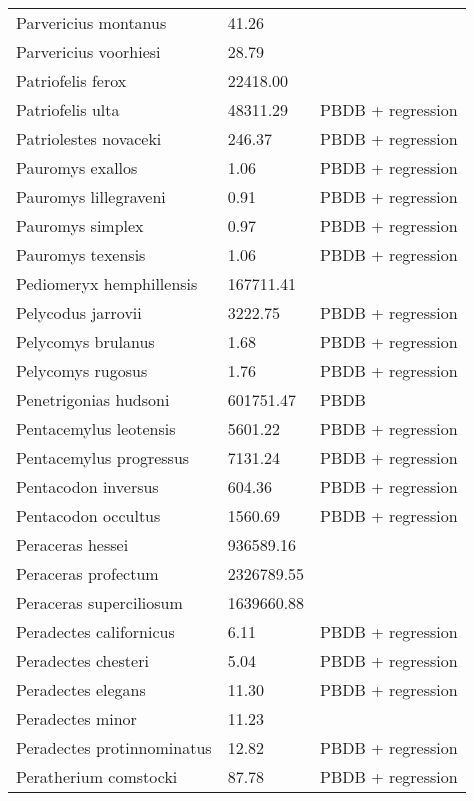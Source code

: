 \documentclass{article}
\begin{document}
\begin{center}
\begin{longtable}{p{} p{} p{}}
    Parvericius montanus & 41.26 & \cite{Tomiya2013} \\ 
    Parvericius voorhiesi & 28.79 & \cite{Tomiya2013} \\ 
    Patriofelis ferox & 22418.00 & \cite{McKenna2011} \\ 
    Patriofelis ulta & 48311.29 & PBDB + regression \\ 
    Patriolestes novaceki & 246.37 & PBDB + regression \\ 
    Pauromys exallos & 1.06 & PBDB + regression \\ 
    Pauromys lillegraveni & 0.91 & PBDB + regression \\ 
    Pauromys simplex & 0.97 & PBDB + regression \\ 
    Pauromys texensis & 1.06 & PBDB + regression \\ 
    Pediomeryx hemphillensis & 167711.41 & \cite{Tomiya2013} \\ 
    Pelycodus jarrovii & 3222.75 & PBDB + regression \\ 
    Pelycomys brulanus & 1.68 & PBDB + regression \\ 
    Pelycomys rugosus & 1.76 & PBDB + regression \\ 
    Penetrigonias hudsoni & 601751.47 & PBDB \\ 
    Pentacemylus leotensis & 5601.22 & PBDB + regression \\ 
    Pentacemylus progressus & 7131.24 & PBDB + regression \\ 
    Pentacodon inversus & 604.36 & PBDB + regression \\ 
    Pentacodon occultus & 1560.69 & PBDB + regression \\ 
    Peraceras hessei & 936589.16 & \cite{Tomiya2013} \\ 
    Peraceras profectum & 2326789.55 & \cite{Tomiya2013} \\ 
    Peraceras superciliosum & 1639660.88 & \cite{Tomiya2013} \\ 
    Peradectes californicus & 6.11 & PBDB + regression \\ 
    Peradectes chesteri & 5.04 & PBDB + regression \\ 
    Peradectes elegans & 11.30 & PBDB + regression \\ 
    Peradectes minor & 11.23 & \cite{Taylor1976} \\ 
    Peradectes protinnominatus & 12.82 & PBDB + regression \\ 
    Peratherium comstocki & 87.78 & PBDB + regression \\ 

\end{longtable}
\end{center}
\end{document}
